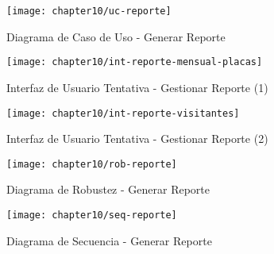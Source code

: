 \begin{figure}[H]
        \centering
        \texttt{[image: chapter10/uc-reporte]}
        \caption{Diagrama de Caso de Uso - Generar Reporte}
        \label{fig:uc-reporte}
    \end{figure}
          \begin{figure}[H]
        \centering
        \texttt{[image: chapter10/int-reporte-mensual-placas]}
        \caption{Interfaz de Usuario Tentativa - Gestionar Reporte (1)}
        \label{fig:int-reporte-mensual-placas}
    \end{figure}
           \begin{figure}[H]
        \centering
        \texttt{[image: chapter10/int-reporte-visitantes]}
        \caption{Interfaz de Usuario Tentativa - Gestionar Reporte (2)}
        \label{fig:int-reporte-visitantes}
    \end{figure}
    \begin{figure}[H]
        \centering
        \texttt{[image: chapter10/rob-reporte]}
        \caption{Diagrama de Robustez - Generar Reporte}
        \label{fig:rob-reporte}
    \end{figure}
     \begin{landscape}

    \begin{figure}[H]
        \centering
        \texttt{[image: chapter10/seq-reporte]}
        \caption{Diagrama de Secuencia - Generar Reporte }
        \label{fig:seq-reporte}
    \end{figure}
    \end{landscape}
    
